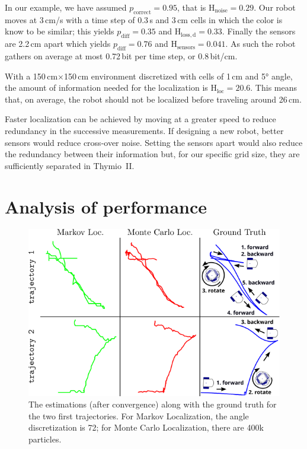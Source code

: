 \documentclass[letterpaper, 10pt, conference]{ieeeconf}
\newcommand{\ent}[1]{\mathrm{H}_\mathrm{#1}} %
\begin{document}
In our example, we have assumed $p_\mathrm{correct}=0.95$, that is $\ent{noise}=0.29$.
Our robot moves at 3\,cm/s with a time step of 0.3\,s and 3\,cm cells in which the color is know to be similar; this yields $p_\mathrm{diff}=0.35$ and $\ent{loss,d}=0.33$.
Finally the sensors are 2.2\,cm apart which yields $p_\mathrm{diff}=0.76$ and $\ent{sensors}=0.041$.
As such the robot gathers on average at most 0.72\,bit per time step, or 0.8\,bit/cm.

With a 150\,cm$\times$150\,cm environment discretized with cells of 1\,cm and 5° angle, the amount of information needed for the localization is $\ent{loc}=20.6$.
This means that, on average, the robot should not be localized before traveling around 26\,cm.

Faster localization can be achieved by moving at a greater speed to reduce redundancy in the successive measurements.
If designing a new robot, better sensors would reduce cross-over noise.
Setting the sensors apart would also reduce the redundancy between their information but, for our specific grid size, they are sufficiently separated in Thymio~II.

\section{Analysis of performance}

\begin{figure}
\includegraphics{trajectories}
\caption{The estimations (after convergence) along with the ground truth for the two first trajectories.
For Markov Localization, the angle discretization is 72; for Monte Carlo Localization, there are 400k particles.
}
\label{fig:trajectories}
\end{figure}
\end{document}
